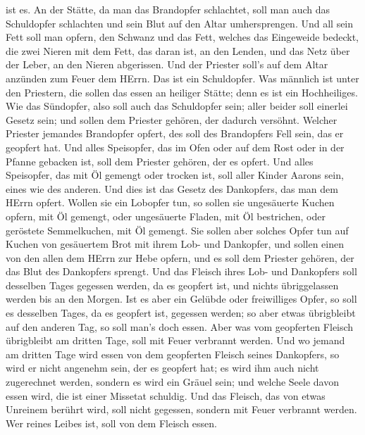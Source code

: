 ist es.  An der Stätte, da man das Brandopfer schlachtet,
soll man auch das Schuldopfer schlachten und sein Blut auf den Altar
umhersprengen.  Und all sein Fett soll man opfern, den
Schwanz und das Fett, welches das Eingeweide bedeckt,  die
zwei Nieren mit dem Fett, das daran ist, an den Lenden, und das Netz
über der Leber, an den Nieren abgerissen.  Und der Priester
soll's auf dem Altar anzünden zum Feuer dem HErrn. Das ist ein
Schuldopfer.  Was männlich ist unter den Priestern, die
sollen das essen an heiliger Stätte; denn es ist ein Hochheiliges.
 Wie das Sündopfer, also soll auch das Schuldopfer sein;
aller beider soll einerlei Gesetz sein; und sollen dem Priester gehören,
der dadurch versöhnt.  Welcher Priester jemandes Brandopfer
opfert, des soll des Brandopfers Fell sein, das er geopfert hat.
 Und alles Speisopfer, das im Ofen oder auf dem Rost oder in
der Pfanne gebacken ist, soll dem Priester gehören, der es opfert.
 Und alles Speisopfer, das mit Öl gemengt oder trocken ist,
soll aller Kinder Aarons sein, eines wie des anderen.  Und
dies ist das Gesetz des Dankopfers, das man dem HErrn opfert.
 Wollen sie ein Lobopfer tun, so sollen sie ungesäuerte
Kuchen opfern, mit Öl gemengt, oder ungesäuerte Fladen, mit Öl
bestrichen, oder geröstete Semmelkuchen, mit Öl gemengt. 
Sie sollen aber solches Opfer tun auf Kuchen von gesäuertem Brot mit
ihrem Lob- und Dankopfer,  und sollen einen von den allen
dem HErrn zur Hebe opfern, und es soll dem Priester gehören, der das
Blut des Dankopfers sprengt.  Und das Fleisch ihres Lob-
und Dankopfers soll desselben Tages gegessen werden, da es geopfert ist,
und nichts übriggelassen werden bis an den Morgen.  Ist es
aber ein Gelübde oder freiwilliges Opfer, so soll es desselben Tages, da
es geopfert ist, gegessen werden; so aber etwas übrigbleibt auf den
anderen Tag, so soll man's doch essen.  Aber was vom
geopferten Fleisch übrigbleibt am dritten Tage, soll mit Feuer verbrannt
werden.  Und wo jemand am dritten Tage wird essen von dem
geopferten Fleisch seines Dankopfers, so wird er nicht angenehm sein,
der es geopfert hat; es wird ihm auch nicht zugerechnet werden, sondern
es wird ein Gräuel sein; und welche Seele davon essen wird, die ist
einer Missetat schuldig.  Und das Fleisch, das von etwas
Unreinem berührt wird, soll nicht gegessen, sondern mit Feuer verbrannt
werden. Wer reines Leibes ist, soll von dem Fleisch essen. 
